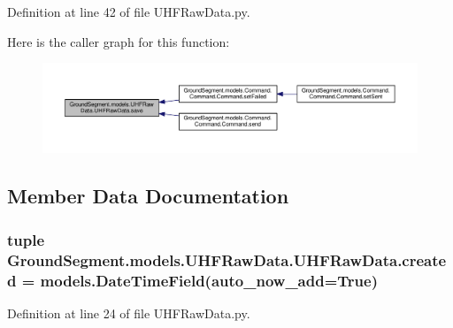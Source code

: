 Definition at line 42 of file U\+H\+F\+Raw\+Data.\+py.



Here is the caller graph for this function\+:\nopagebreak
\begin{figure}[H]
\begin{center}
\leavevmode
\includegraphics[width=350pt]{class_ground_segment_1_1models_1_1_u_h_f_raw_data_1_1_u_h_f_raw_data_a0ffa42aeb51aede4dba8bf88afa8e6b8_icgraph}
\end{center}
\end{figure}




\subsection{Member Data Documentation}
\hypertarget{class_ground_segment_1_1models_1_1_u_h_f_raw_data_1_1_u_h_f_raw_data_ac9fc4f0ad0f0b8e8f4b45b54fbdd93d4}{}
\subsubsection[{created}]{\setlength{\rightskip}{0pt plus 5cm}tuple Ground\+Segment.\+models.\+U\+H\+F\+Raw\+Data.\+U\+H\+F\+Raw\+Data.\+created = models.\+Date\+Time\+Field(auto\+\_\+now\+\_\+add=True)\hspace{0.3cm}{\ttfamily [static]}}\label{class_ground_segment_1_1models_1_1_u_h_f_raw_data_1_1_u_h_f_raw_data_ac9fc4f0ad0f0b8e8f4b45b54fbdd93d4}


Definition at line 24 of file U\+H\+F\+Raw\+Data.\+py.

\hypertarget{class_ground_segment_1_1models_1_1_u_h_f_raw_data_1_1_u_h_f_raw_data_a617ee1b3a10bfb1dbdad7f5e58ecd111}{}
